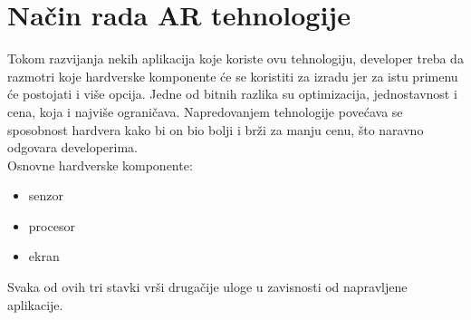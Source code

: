 \documentclass[a4paper]{article}
\begin{document}
	\section{Način rada AR tehnologije}
	\label{sec:Način rada AR tehnologije}
    Tokom razvijanja nekih aplikacija koje koriste ovu tehnologiju, developer treba da razmotri koje hardverske komponente će se koristiti za izradu jer za istu primenu će postojati i više opcija. Jedne od bitnih razlika su optimizacija, jednostavnost i cena, koja i najviše ograničava. Napredovanjem tehnologije povećava se sposobnost hardvera kako bi on bio bolji i brži za manju cenu, što naravno odgovara developerima.\\
    Osnovne hardverske komponente:
    \begin{itemize}
     \item senzor
     \item procesor
     \item ekran
    \end{itemize}
	Svaka od ovih tri stavki vrši drugačije uloge u zavisnosti od napravljene aplikacije.
\end{document}
